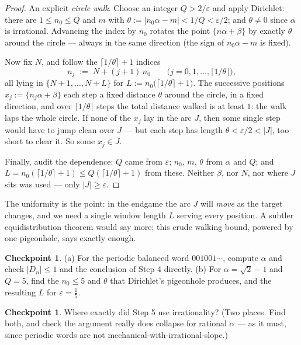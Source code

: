 \documentclass[11pt,reqno]{amsart}
\theoremstyle{plain}
\theoremstyle{definition}
\newtheorem{checkpoint}[theorem]{Checkpoint}   %
\theoremstyle{remark}
\begin{document}
\begin{proof}
An explicit \emph{circle walk}. Choose an integer $Q > 2/\varepsilon$ and apply
Dirichlet: there are $1 \le n_0 \le Q$ and $m$ with $\theta := |n_0\alpha - m| <
1/Q < \varepsilon/2$; and $\theta \ne 0$ since $\alpha$ is irrational. Advancing the
index by $n_0$ rotates the point $\{n\alpha + \beta\}$ by exactly $\theta$ around
the circle --- always in the same direction (the sign of $n_0\alpha - m$ is fixed).

Now fix $N$, and follow the $\lceil 1/\theta \rceil + 1$ indices
\[
  n_j \;:=\; N + (j+1)\,n_0 \qquad \big(j = 0, 1, \dots, \lceil 1/\theta \rceil\big),
\]
all lying in $\{N+1, \dots, N+L\}$ for
$L := n_0 \big( \lceil 1/\theta \rceil + 1 \big)$. The successive positions $x_j :=
\{n_j \alpha + \beta\}$ each step a fixed distance $\theta$ around the circle, in a
fixed direction, and over $\lceil 1/\theta \rceil$ steps the total distance walked
is at least $1$: the walk laps the whole circle. If none of the $x_j$ lay in the
arc $J$, then some single step would have to jump clean over $J$ --- but each step
has length $\theta < \varepsilon/2 < |J|$, too short to clear it. So some $x_j \in
J$.

Finally, audit the dependence: $Q$ came from $\varepsilon$; $n_0$, $m$, $\theta$
from $\alpha$ and $Q$; and $L = n_0(\lceil 1/\theta \rceil + 1) \le Q(\lceil
1/\theta\rceil + 1)$ from these. Neither $\beta$, nor $N$, nor where $J$ sits was
used --- only $|J| \ge \varepsilon$.
\end{proof}

The uniformity is the point: in the endgame the arc $J$ will \emph{move} as the
target changes, and we need a single window length $L$ serving every position. A
subtler equidistribution theorem would say more; this crude walking bound, powered
by one pigeonhole, says exactly enough.

\begin{checkpoint}
(a) For the periodic balanced word $001001\cdots$, compute $\alpha$ and check
$|D_n| \le 1$ and the conclusion of Step 4 directly.
(b) For $\alpha = \sqrt2 - 1$ and $Q = 5$, find the $n_0 \le 5$ and $\theta$
that Dirichlet's pigeonhole produces, and the resulting $L$ for $\varepsilon =
\tfrac15$.
\end{checkpoint}

\begin{checkpoint}
Where exactly did Step 5 use irrationality? (Two places. Find both, and check the
argument really does collapse for rational $\alpha$ --- as it must, since periodic
words are not mechanical-with-irrational-slope.)
\end{checkpoint}
\end{document}

